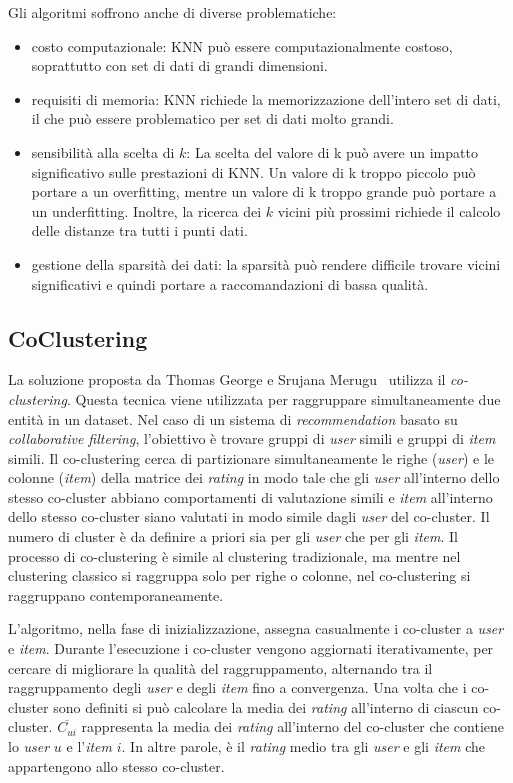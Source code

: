 Gli algoritmi soffrono anche di diverse problematiche:
\begin{itemize}
    \item costo computazionale: KNN può essere computazionalmente costoso, soprattutto con set di dati di grandi dimensioni.
    \item requisiti di memoria: KNN richiede la memorizzazione dell'intero set di dati, il che può essere problematico per set di dati molto grandi.
    \item sensibilità alla scelta di $k$: La scelta del valore di k può avere un impatto significativo sulle prestazioni di KNN. Un valore di k troppo piccolo può portare a un overfitting, mentre un valore di k troppo grande può portare a un underfitting. Inoltre, la ricerca dei $k$ vicini più prossimi richiede il calcolo delle distanze tra tutti i punti dati.
    \item gestione della sparsità dei dati: la sparsità può rendere difficile trovare vicini significativi e quindi portare a raccomandazioni di bassa qualità.
\end{itemize}

\subsection{CoClustering}\label{coclustering}

La soluzione proposta da Thomas George e Srujana Merugu~\cite{Co-Clustering} utilizza il \textit{co-clustering}. Questa tecnica viene utilizzata per raggruppare simultaneamente due entità in un dataset. Nel caso di un sistema di \textit{recommendation} basato su \textit{collaborative filtering}, l'obiettivo è trovare gruppi di \textit{user} simili e gruppi di \textit{item} simili. Il co-clustering cerca di partizionare simultaneamente le righe (\textit{user}) e le colonne (\textit{item}) della matrice dei \textit{rating} in modo tale che gli \textit{user} all'interno dello stesso co-cluster abbiano comportamenti di valutazione simili e \textit{item} all'interno dello stesso co-cluster siano valutati in modo simile dagli \textit{user} del co-cluster. Il numero di cluster è da definire a priori sia per gli \textit{user} che per gli \textit{item}. Il processo di co-clustering è simile al clustering tradizionale, ma mentre nel clustering classico si raggruppa solo per righe o colonne, nel co-clustering si raggruppano contemporaneamente. 

L'algoritmo, nella fase di inizializzazione, assegna casualmente i co-cluster a \textit{user} e \textit{item}. Durante l'esecuzione i co-cluster vengono aggiornati iterativamente, per cercare di migliorare la qualità del raggruppamento, alternando tra il raggruppamento degli \textit{user} e degli \textit{item} fino a convergenza. Una volta che i co-cluster sono definiti si può calcolare la media dei \textit{rating} all'interno di ciascun co-cluster. $ \overline{C_{ui}} $ rappresenta la media dei \textit{rating} all'interno del co-cluster che contiene lo \textit{user} $ u $ e l'\textit{item} $ i $. In altre parole, è il \textit{rating} medio tra gli \textit{user} e gli \textit{item} che appartengono allo stesso co-cluster.

